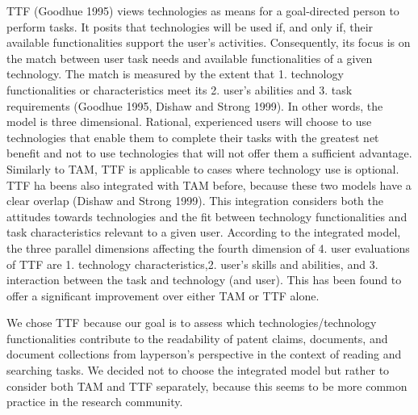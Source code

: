 \documentclass[11pt]{article}
\begin{document}
TTF (Goodhue 1995) views technologies as means for a goal-directed person to perform tasks. It posits that technologies will be used if, and only if, their available functionalities support the user’s activities. Consequently, its focus is on the match between user task needs  and available functionalities of a given technology. The match is measured by the extent that 1. technology functionalities or characteristics meet its 2. user’s abilities and 3. task requirements (Goodhue 1995, Dishaw and Strong 1999). In other words, the model is three dimensional. Rational, experienced users will choose to use technologies that enable them to complete their tasks with the greatest net benefit and not to use technologies that will not offer them a sufficient advantage. Similarly to TAM, TTF is applicable to cases where technology use is optional. TTF ha beens also integrated with TAM before, because these two models have a clear overlap (Dishaw and Strong 1999). This integration considers both the attitudes towards technologies and the fit between technology functionalities and task characteristics relevant to a given user. According to the integrated model, the three parallel dimensions affecting the fourth dimension of 4. user evaluations of TTF are 1. technology characteristics,2. user’s skills and abilities, and 3. interaction between the task and technology (and user). This has been found to offer a significant improvement over either TAM or TTF alone. 

We chose TTF because our goal is to assess which technologies/technology functionalities contribute to the readability of patent claims, documents, and document collections from layperson’s perspective in the context of  reading and searching tasks. We decided not to choose the integrated model but rather to consider both TAM and TTF separately, because this seems to be more common practice in the research community. 
\end{document}
